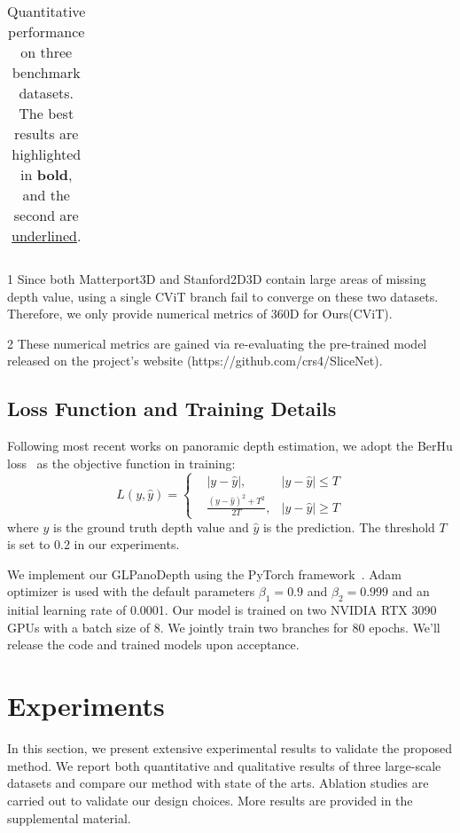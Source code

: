 \documentclass[10pt,twocolumn,letterpaper]{article}
\begin{document}
\begin{table*}[tp]
\begin{threeparttable}
\begin{tabular}{clcccccc}
    \bottomrule
    \end{tabular}
    \begin{tablenotes}
        \footnotesize
        \item[1] Since both Matterport3D and Stanford2D3D contain large areas of missing depth value, using a single CViT branch fail to converge on these two datasets. Therefore, we only provide numerical metrics of 360D for Ours(CViT).
        \item[2] These numerical metrics are gained via re-evaluating the pre-trained model released on the project's website (https://github.com/crs4/SliceNet).
      \end{tablenotes}
    \end{threeparttable}
      \caption{Quantitative performance on three benchmark datasets. The best results are highlighted in \textbf{bold}, and the second are \underline{underlined}.}
  \label{tab:performance_comparison}
\end{table*}

\subsection{Loss Function and Training Details}
Following most recent works on panoramic depth estimation, we adopt the BerHu loss~\cite{Laina_2016_3DV} as the objective function in training:
\begin{equation}
L(y,\hat{y})=\left\{
\begin{aligned}
 &|y-\hat{y}|, & |y-\hat{y}| \leq T \\
&\frac{(y-\hat{y})^2+T^2}{2T},  & |y-\hat{y}| \ge T
\end{aligned}
\right.
\label{eq6}
\end{equation}
where $y$ is the ground truth depth value and $\hat{y}$ is the prediction. The threshold $T$ is set to 0.2 in our experiments.

We implement our GLPanoDepth using the PyTorch framework~\cite{pytorch}. Adam~\cite{kingma2017adam} optimizer is used with the default parameters $\beta_1=0.9$ and $\beta_2 =  0.999$ and an initial learning rate of 0.0001.
Our model is trained on two NVIDIA RTX 3090 GPUs with a batch size of 8. We jointly train two branches for 80 epochs. We'll release the code and trained models upon acceptance.


\section{Experiments}
In this section, we present extensive experimental results to validate the proposed method. We report both quantitative and qualitative results of three large-scale datasets and compare our method with state of the arts. Ablation studies are carried out to validate our design choices. More results are provided in the supplemental material.
\end{document}
